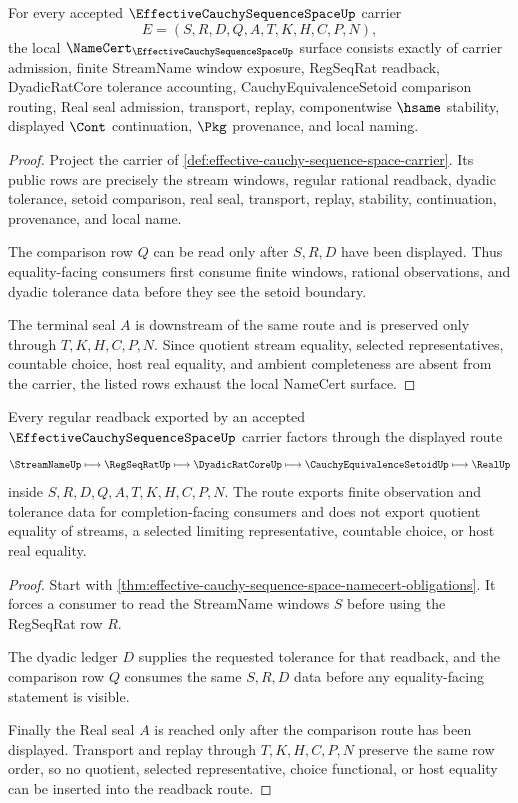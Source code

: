 \begin{theorem}
\label{thm:effective-cauchy-sequence-space-namecert-obligations}
For every accepted $\EffectiveCauchySequenceSpaceUp$ carrier
$$
E=(S,R,D,Q,A,T,K,H,C,P,N),
$$
the local $\NameCert_{\EffectiveCauchySequenceSpaceUp}$ surface consists exactly of carrier admission, finite StreamName window exposure, RegSeqRat readback, DyadicRatCore tolerance accounting, CauchyEquivalenceSetoid comparison routing, Real seal admission, transport, replay, componentwise $\hsame$ stability, displayed $\Cont$ continuation, $\Pkg$ provenance, and local naming.
\end{theorem}
\begin{proof}
Project the carrier of \autoref{def:effective-cauchy-sequence-space-carrier}. Its public rows are precisely the stream windows, regular rational readback, dyadic tolerance, setoid comparison, real seal, transport, replay, stability, continuation, provenance, and local name.

The comparison row $Q$ can be read only after $S,R,D$ have been displayed. Thus equality-facing consumers first consume finite windows, rational observations, and dyadic tolerance data before they see the setoid boundary.

The terminal seal $A$ is downstream of the same route and is preserved only through $T,K,H,C,P,N$. Since quotient stream equality, selected representatives, countable choice, host real equality, and ambient completeness are absent from the carrier, the listed rows exhaust the local NameCert surface.
\end{proof}

\begin{theorem}
\label{thm:effective-cauchy-sequence-space-regular-readback-route}
Every regular readback exported by an accepted $\EffectiveCauchySequenceSpaceUp$ carrier factors through the displayed route
$$
\StreamNameUp \longmapsto \RegSeqRatUp \longmapsto \DyadicRatCoreUp \longmapsto \CauchyEquivalenceSetoidUp \longmapsto \RealUp
$$
inside $S,R,D,Q,A,T,K,H,C,P,N$. The route exports finite observation and tolerance data for completion-facing consumers and does not export quotient equality of streams, a selected limiting representative, countable choice, or host real equality.
\end{theorem}
\begin{proof}
Start with \autoref{thm:effective-cauchy-sequence-space-namecert-obligations}. It forces a consumer to read the StreamName windows $S$ before using the RegSeqRat row $R$.

The dyadic ledger $D$ supplies the requested tolerance for that readback, and the comparison row $Q$ consumes the same $S,R,D$ data before any equality-facing statement is visible.

Finally the Real seal $A$ is reached only after the comparison route has been displayed. Transport and replay through $T,K,H,C,P,N$ preserve the same row order, so no quotient, selected representative, choice functional, or host equality can be inserted into the readback route.
\end{proof}

